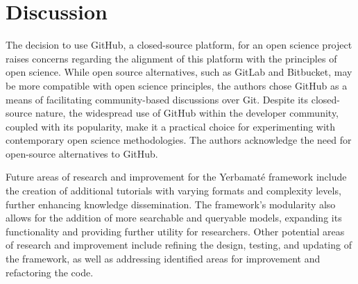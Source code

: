 \section{Discussion}

The decision to use GitHub, a closed-source platform, for an open science project raises concerns regarding the alignment of this platform with the principles of open science. While open source alternatives, such as GitLab and Bitbucket, may be more compatible with open science principles, the authors chose GitHub as a means of facilitating community-based discussions over Git. Despite its closed-source nature, the widespread use of GitHub within the developer community, coupled with its popularity, make it a practical choice for experimenting with contemporary open science methodologies. The authors acknowledge the need for open-source alternatives to GitHub. 

Future areas of research and improvement for the Yerbamaté framework include the creation of additional tutorials with varying formats and complexity levels, further enhancing knowledge dissemination. The framework's modularity also allows for the addition of more searchable and queryable models, expanding its functionality and providing further utility for researchers. Other potential areas of research and improvement include refining the design, testing, and updating of the framework, as well as addressing identified areas for improvement and refactoring the code.
